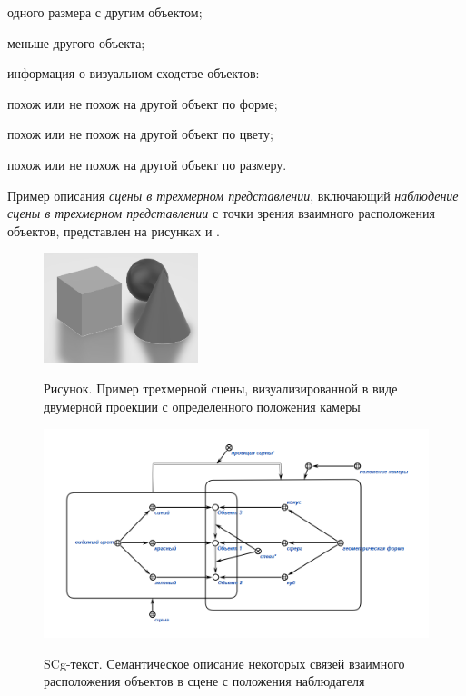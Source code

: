\begin{textitemize}
\begin{textitemize}
        \item одного размера с другим объектом;
        \item меньше другого объекта;
    \end{textitemize}
    \item информация о визуальном сходстве объектов:
    \begin{textitemize}
        \item похож или не похож на другой объект по форме;
        \item похож или не похож на другой объект по цвету;
        \item похож или не похож на другой объект по размеру.
    \end{textitemize}
\end{textitemize}


Пример описания \textit{сцены в трехмерном представлении}, включающий \textit{наблюдение сцены в трехмерном представлении} с точки зрения взаимного расположения объектов, представлен на рисунках \textit{} и \textit{}.

\begin{figure}[H]
    \caption{Рисунок. Пример трехмерной сцены, визуализированной в виде двумерной проекции с определенного положения камеры}
    \includegraphics[scale=0.8, width=0.4\textwidth]{author/part4/figures/scene-example.png}
    \label{fig:scene-example}
\end{figure}

\begin{figure}[H]
    \caption{SCg-текст. Семантическое описание некоторых связей взаимного расположения объектов в сцене с положения наблюдателя}
    \includegraphics[scale=0.8, width=1.0\textwidth]{author/part4/figures/scene-description.png}
    \label{fig:scene-description}
\end{figure}

